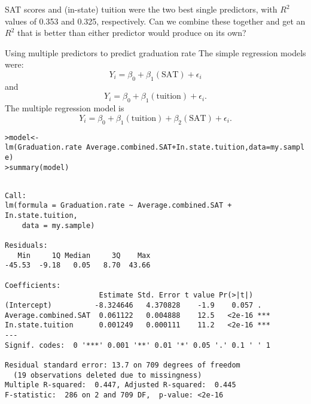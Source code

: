 \documentclass{beamer}\usepackage[]{graphicx}\usepackage[]{color}
\makeatletter
\newcommand{\hlopt}[1]{\textcolor[rgb]{1,0.894,0.769}{#1}}%
\newcommand{\hlstd}[1]{\textcolor[rgb]{1,0.894,0.769}{#1}}%
\newcommand{\hlkwb}[1]{\textcolor[rgb]{0.804,0.776,0.451}{#1}}%
\newcommand{\hlkwc}[1]{\textcolor[rgb]{0.78,0.941,0.545}{#1}}%
\newcommand{\hlkwd}[1]{\textcolor[rgb]{1,0.78,0.769}{#1}}%
\newenvironment{kframe}{%
 \def\at@end@of@kframe{}%
 \ifinner\ifhmode%
  \def\at@end@of@kframe{\end{minipage}}%
  \begin{minipage}{\columnwidth}%
 \fi\fi%
 \def\FrameCommand##1{\hskip\@totalleftmargin \hskip-\fboxsep
 \colorbox{shadecolor}{##1}\hskip-\fboxsep
     \hskip-\linewidth \hskip-\@totalleftmargin \hskip\columnwidth}%
 \MakeFramed {\advance\hsize-\width
   \@totalleftmargin\z@ \linewidth\hsize
   \@setminipage}}%
 {\par\unskip\endMakeFramed%
 \at@end@of@kframe}
\newenvironment{knitrout}{}{} %
\makeatother
\begin{document}
\begin{darkframes}
    \begin{frame}[fragile]

      \begin{center}
        SAT scores and (in-state) tuition were the two best single predictors, with $R^2$ values of 0.353 and 0.325, respectively. Can we combine these together and get an $R^2$ that is better than either predictor would produce on its own?
      \end{center}
    \end{frame}

    \begin{frame}{Using multiple predictors to predict graduation rate}
      The simple regression models were:
      \[
        Y_i = \beta_0 + \beta_1 (\text{SAT}) + \epsilon_i
      \]
      and
      \[
        Y_i = \beta_0 + \beta_1 (\text{tuition}) + \epsilon_i.
      \]
      The multiple regression model is
      \[
        Y_i = \beta_0 + \beta_1 (\text{tuition}) + \beta_2 (\text{SAT}) + \epsilon_i.
      \]
    \end{frame}

    \begin{frame}[fragile]
      \fontsize{8}{8}
\begin{knitrout}
\begin{kframe}
\begin{alltt}
\hlstd{> }\hlstd{model} \hlkwb{<-} \hlkwd{lm}\hlstd{(Graduation.rate} \hlopt{~} \hlstd{Average.combined.SAT} \hlopt{+} \hlstd{In.state.tuition,} \hlkwc{data}\hlstd{=my.sample)}
\hlstd{> }\hlkwd{summary}\hlstd{(model)}
\end{alltt}
\begin{verbatim}

Call:
lm(formula = Graduation.rate ~ Average.combined.SAT + In.state.tuition, 
    data = my.sample)

Residuals:
   Min     1Q Median     3Q    Max 
-45.53  -9.18   0.05   8.70  43.66 

Coefficients:
                      Estimate Std. Error t value Pr(>|t|)    
(Intercept)          -8.324646   4.370828    -1.9    0.057 .  
Average.combined.SAT  0.061122   0.004888    12.5   <2e-16 ***
In.state.tuition      0.001249   0.000111    11.2   <2e-16 ***
---
Signif. codes:  0 '***' 0.001 '**' 0.01 '*' 0.05 '.' 0.1 ' ' 1

Residual standard error: 13.7 on 709 degrees of freedom
  (19 observations deleted due to missingness)
Multiple R-squared:  0.447,	Adjusted R-squared:  0.445 
F-statistic:  286 on 2 and 709 DF,  p-value: <2e-16
\end{verbatim}
\end{kframe}
\end{knitrout}
    \end{frame}


\end{darkframes}
\end{document}
